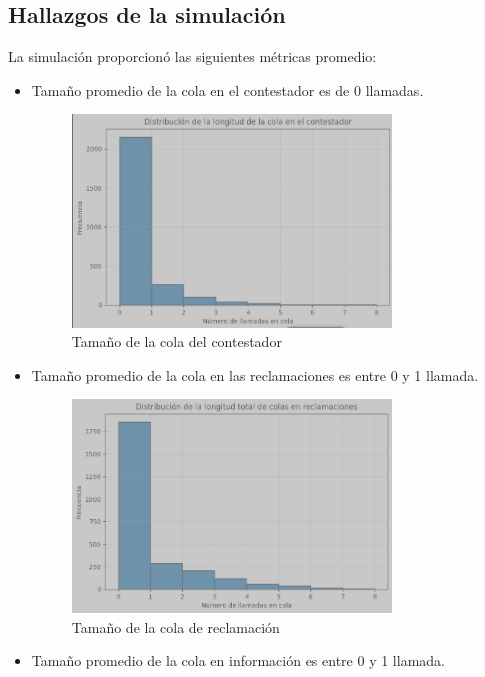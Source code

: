\documentclass[12pt]{article}
\begin{document}
\subsection{Hallazgos de la simulación}
La simulación proporcionó las siguientes métricas promedio:
\begin{itemize}
    \item Tamaño promedio de la cola en el contestador es de 0 llamadas.
    \begin{figure}[h]
        \centering
        \includegraphics[width=0.8\textwidth]{Answ_queue.png}
        \caption{Tamaño de la cola del contestador}
        \label{fig: Tamaño de la cola del contestador}
    \end{figure}
    \item Tamaño promedio de la cola en las reclamaciones es entre 0 y 1 llamada.
    \begin{figure}[h]
        \centering
        \includegraphics[width=0.8\textwidth]{claim_queue.png}
        \caption{Tamaño de la cola de reclamación}
        \label{fig:Tamaño de la cola de reclamación}
    \end{figure}
    \item Tamaño promedio de la cola en información es entre 0 y 1 llamada.

\end{itemize}
\end{document}
